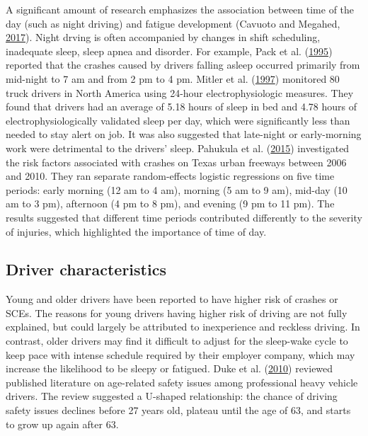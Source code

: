 \documentclass[12pt]{book}
\numberwithin{equation}{chapter}
\begin{document}
A significant amount of research emphasizes the association between time of the day (such as night driving) and fatigue development (Cavuoto and Megahed, \protect\hyperlink{ref-cavuoto2017understanding}{2017}). Night drving is often accompanied by changes in shift scheduling, inadequate sleep, sleep apnea and disorder. For example, Pack et al. (\protect\hyperlink{ref-pack1995characteristics}{1995}) reported that the crashes caused by drivers falling asleep occurred primarily from mid-night to 7 am and from 2 pm to 4 pm. Mitler et al. (\protect\hyperlink{ref-mitler1997sleep}{1997}) monitored 80 truck drivers in North America using 24-hour electrophysiologic measures. They found that drivers had an average of 5.18 hours of sleep in bed and 4.78 hours of electrophysiologically validated sleep per day, which were significantly less than needed to stay alert on job. It was also suggested that late-night or early-morning work were detrimental to the drivers' sleep. Pahukula et al. (\protect\hyperlink{ref-pahukula2015time}{2015}) investigated the risk factors associated with crashes on Texas urban freeways between 2006 and 2010. They ran separate random-effects logistic regressions on five time periods: early morning (12 am to 4 am), morning (5 am to 9 am), mid-day (10 am to 3 pm), afternoon (4 pm to 8 pm), and evening (9 pm to 11 pm). The results suggested that different time periods contributed differently to the severity of injuries, which highlighted the importance of time of day.

\hypertarget{driver-characteristics}{%
\subsection{Driver characteristics}\label{driver-characteristics}}

Young and older drivers have been reported to have higher risk of crashes or SCEs. The reasons for young drivers having higher risk of driving are not fully explained, but could largely be attributed to inexperience and reckless driving. In contrast, older drivers may find it difficult to adjust for the sleep-wake cycle to keep pace with intense schedule required by their employer company, which may increase the likelihood to be sleepy or fatigued. Duke et al. (\protect\hyperlink{ref-duke2010age}{2010}) reviewed published literature on age-related safety issues among professional heavy vehicle drivers. The review suggested a U-shaped relationship: the chance of driving safety issues declines before 27 years old, plateau until the age of 63, and starts to grow up again after 63.
\end{document}
